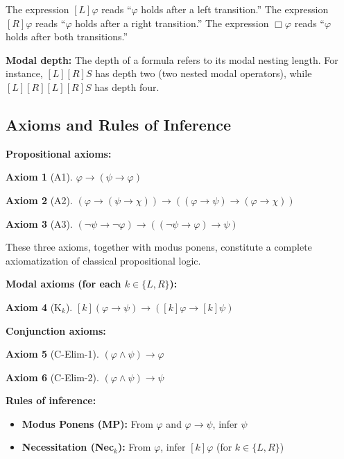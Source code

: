 \documentclass[11pt,a4paper]{article}
\newtheorem{axiom}{Axiom}
\theoremstyle{definition}
\theoremstyle{remark}
\begin{document}
The expression $[L]\varphi$ reads ``$\varphi$ holds after a left transition.'' The expression $[R]\varphi$ reads ``$\varphi$ holds after a right transition.'' The expression $\Box\varphi$ reads ``$\varphi$ holds after both transitions.''

\textbf{Modal depth:} The depth of a formula refers to its modal nesting length. For instance, $[L][R]S$ has depth two (two nested modal operators), while $[L][R][L][R]S$ has depth four.

\subsection{Axioms and Rules of Inference}

\textbf{Propositional axioms:}
\begin{axiom}[A1]
$\varphi \to (\psi \to \varphi)$
\end{axiom}

\begin{axiom}[A2]
$(\varphi \to (\psi \to \chi)) \to ((\varphi \to \psi) \to (\varphi \to \chi))$
\end{axiom}

\begin{axiom}[A3]
$(\neg\psi \to \neg\varphi) \to ((\neg\psi \to \varphi) \to \psi)$
\end{axiom}

These three axioms, together with modus ponens, constitute a complete axiomatization of classical propositional logic.

\textbf{Modal axioms (for each $k \in \{L, R\}$):}
\begin{axiom}[K$_k$]
$[k](\varphi \to \psi) \to ([k]\varphi \to [k]\psi)$
\end{axiom}

\textbf{Conjunction axioms:}
\begin{axiom}[C-Elim-1]
$(\varphi \land \psi) \to \varphi$
\end{axiom}

\begin{axiom}[C-Elim-2]
$(\varphi \land \psi) \to \psi$
\end{axiom}

\textbf{Rules of inference:}
\begin{itemize}
\item \textbf{Modus Ponens (MP):} From $\varphi$ and $\varphi \to \psi$, infer $\psi$
\item \textbf{Necessitation (Nec$_k$):} From $\varphi$, infer $[k]\varphi$ (for $k \in \{L, R\}$)
\end{itemize}
\end{document}
